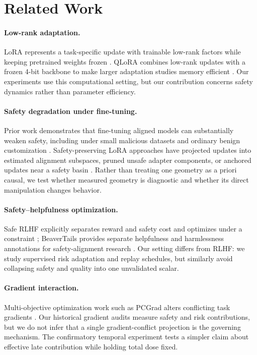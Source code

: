 \section{Related Work}

\paragraph{Low-rank adaptation.}
LoRA represents a task-specific update with trainable low-rank factors while keeping pretrained weights frozen \citep{hu2022lora}. QLoRA combines low-rank updates with a frozen 4-bit backbone to make larger adaptation studies memory efficient \citep{dettmers2023qlora}. Our experiments use this computational setting, but our contribution concerns safety dynamics rather than parameter efficiency.

\paragraph{Safety degradation under fine-tuning.}
Prior work demonstrates that fine-tuning aligned models can substantially weaken safety, including under small malicious datasets and ordinary benign customization \citep{qi2024finetuning}. Safety-preserving LoRA approaches have projected updates into estimated alignment subspaces, pruned unsafe adapter components, or anchored updates near a safety basin \citep{hsu2024safelora,ao2025splora,yang2025asft}. Rather than treating one geometry as a priori causal, we test whether measured geometry is diagnostic and whether its direct manipulation changes behavior.

\paragraph{Safety--helpfulness optimization.}
Safe RLHF explicitly separates reward and safety cost and optimizes under a constraint \citep{dai2023saferlhf}; BeaverTails provides separate helpfulness and harmlessness annotations for safety-alignment research \citep{ji2023beavertails}. Our setting differs from RLHF: we study supervised risk adaptation and replay schedules, but similarly avoid collapsing safety and quality into one unvalidated scalar.

\paragraph{Gradient interaction.}
Multi-objective optimization work such as PCGrad alters conflicting task gradients \citep{yu2020gradient}. Our historical gradient audits measure safety and risk contributions, but we do not infer that a single gradient-conflict projection is the governing mechanism. The confirmatory temporal experiment tests a simpler claim about effective late contribution while holding total dose fixed.

